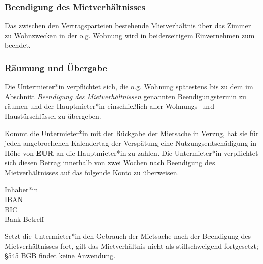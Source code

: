 

\subsubsection*{Beendigung des Mietverhältnisses}

Das zwischen den Vertragsparteien bestehende Mietverhältnis über das Zimmer
zu Wohnzwecken in der o.g. Wohnung wird in beiderseitigem Einvernehmen zum
\textbf{\CONTRACTenddate{}} beendet.

\subsubsection*{Räumung und Übergabe}

Die Untermieter*in verpflichtet sich, die o.g. Wohnung spätestens bis zu
dem im Abschnitt \emph{Beendigung des Mietverhältnissen} genannten
Beendigungstermin zu räumen und der Hauptmieter*in einschließlich aller
Wohnungs- und Haustürschlüssel zu übergeben.

Kommt die Untermieter*in mit der Rückgabe der Mietsache in Verzug, hat sie
für jeden angebrochenen Kalendertag der Verspätung eine
Nutzungsentschädigung in Höhe von \textbf{\CONTRACTdelay{} EUR} an die
Hauptmieter*in zu zahlen. Die Untermieter*in verpflichtet sich diesen
Betrag innerhalb von zwei Wochen nach Beendigung des Mietverhältnisses auf
das folgende Konto zu überweisen.

\vspace{2ex}
\begin{addmargin}[.25\textwidth]{.25\textwidth}
  Inhaber*in \MYdotfill \textbf{\ACCOUNTowner} \\
  IBAN \MYdotfill \textbf{\ACCOUNTiban} \\
  BIC \MYdotfill \textbf{\ACCOUNTbic} \\
  Bank \MYdotfill \textbf{\ACCOUNTinstitute}
  Betreff \MYdotfill \textbf{\ACCOUNTinstitute}
\end{addmargin}
\vspace{2ex}

Setzt die Untermieter*in den Gebrauch der Mietsache nach der Beendigung des
Mietverhältnisses fort, gilt das Mietverhältnis nicht als stillschweigend
fortgesetzt; §545 BGB findet keine Anwendung.

